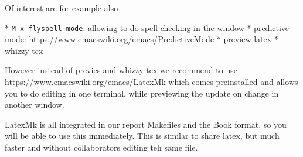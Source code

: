 
Of interest are for example also 

* \verb|M-x flyspell-mode|: allowing to do spell checking in the window
* predictive mode: https://www.emacswiki.org/emacs/PredictiveMode
* preview latex
* whizzy tex

However instead of previes and whizzy tex we recommend to use
\url{https://www.emacswiki.org/emacs/LatexMk} which comes preinstalled
and allows you to do editing in one terminal, while previewing the
update on change in another window.

LatexMk is all integrated in our report Makefiles and the Book format,
so you will be able to use this immediately. This is similar to share
latex, but much faster and without collaborators editing teh same file.